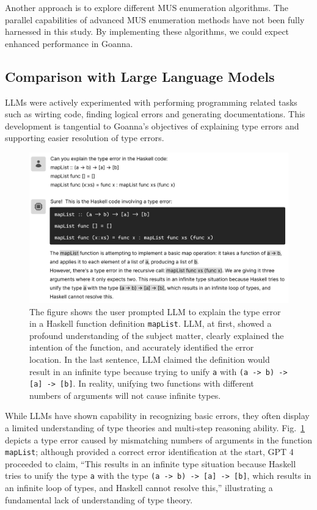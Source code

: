 \documentclass[pdflatex,sn-mathphys-num]{sn-jnl}%
\begin{document}
Another approach is to explore different MUS enumeration algorithms. The parallel capabilities of advanced MUS enumeration methods \cite{Zhao2016-bu, Bendik2020-pz} have not been fully harnessed in this study. By implementing these algorithms, we could expect enhanced performance in Goanna.


\subsection{Comparison with Large Language Models}
    
LLMs were actively experimented with performing programming related tasks such as wirting code, finding logical errors and generating documentations.  This development is tangential to Goanna's objectives of explaining type errors and supporting easier resolution of type errors. 

\begin{figure}[hbt]
  \includegraphics[width=\linewidth]{images/LLM.pdf}
  \caption[LLM explaining a type error; it began very accurate, then went on to give incorrect and contradicting analysis]{\label{fig:llm}
  The figure shows the user prompted LLM to explain the type error in a Haskell function definition \texttt{mapList}. LLM, at first, showed a profound understanding of the subject matter, clearly explained the intention of the function, and accurately identified the error location. In the last sentence, LLM claimed the definition would result in an infinite type because trying to unify \texttt{a} with \texttt{(a -> b) -> [a] -> [b]}. In reality, unifying two functions with different numbers of arguments will not cause infinite types. 
    }
\end{figure}

While LLMs have shown capability in recognizing basic errors, they often display a limited understanding of type theories and multi-step reasoning ability. Fig.~\ref{fig:llm} depicts a type error caused by mismatching numbers of arguments in the function \texttt{mapList}; although provided a correct error identification at the start, GPT 4 proceeded to claim, “This results in an infinite type situation because Haskell tries to unify the type \texttt{a} with the type \texttt{(a -> b) -> [a] -> [b]}, which results in an infinite loop of types, and Haskell cannot resolve this,” illustrating a fundamental lack of understanding of type theory.
\end{document}
